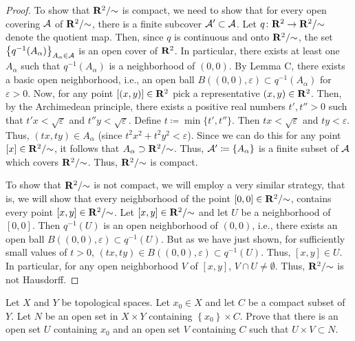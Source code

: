\begin{proof}
To show that $\mathbf{R}^2/{\sim}$ is compact, we need to show that for every
open covering $\mathcal{A}$ of $\mathbf{R}^2/{\sim}$, there is a finite subcover
$\mathcal{A}'\subset\mathcal{A}$. Let $q\colon\mathbf{R}^2\to\mathbf{R}^2/{\sim}$ denote the
quotient map. Then, since $q$ is continuous and onto $\mathbf{R}^2/{\sim}$, the
set $\left\{q^{-1}(A_\alpha)\right\}_{A_\alpha\in\mathcal{A}}$ is an open cover
of $\mathbf{R}^2$. In particular, there exists at least one $A_\alpha$ such that
$q^{-1}(A_\alpha)$ is a neighborhood of $(0,0)$. By Lemma C, there exists a
basic open neighborhood, i.e., an open ball $B((0,0),\varepsilon)\subset
q^{-1}(A_\alpha)$ for $\varepsilon>0$. Now, for any point
$[(x,y)]\in\mathbf{R}^2$ pick a representative $(x,y)\in\mathbf{R}^2$. Then, by the
Archimedean principle, there exists a positive real numbers $t',t''>0$ such
that $t'x<\sqrt{\varepsilon}$ and $t''y<\sqrt{\varepsilon}$. Define
$t\coloneqq\min\{t',t''\}$. Then $tx<\sqrt{\varepsilon}$ and
$ty<\varepsilon$. Thus, $(tx,ty)\in A_\alpha$ (since
$t^2x^2+t^2y^2<\varepsilon$). Since we can do this for any point
$[x]\in\mathbf{R}^2/{\sim}$, it follows that
$A_\alpha\supset\mathbf{R}^2/{\sim}$. Thus,
$\mathcal{A}'\coloneqq\left\{A_\alpha\right\}$ is a finite subset of $\mathcal{A}$
which covers $\mathbf{R}^2/{\sim}$. Thus, $\mathbf{R}^2/{\sim}$ is compact.

To show that $\mathbf{R}^2/{\sim}$ is not compact, we will employ a very similar
strategy, that is, we will show that every neighborhood of the point
$[0,0]\in\mathbf{R}^2/{\sim}$, contains every point $[x,y]\in\mathbf{R}^2/{\sim}$. Let
$[x,y]\in\mathbf{R}^2/{\sim}$ and let $U$ be a neighborhood of $[0,0]$. Then
$q^{-1}(U)$ is an open neighborhood of $(0,0)$, i.e., there exists an open
ball $B((0,0),\varepsilon)\subset q^{-1}(U)$. But as we have just shown,
for sufficiently small values of $t>0$, $(tx,ty)\in
B((0,0),\varepsilon)\subset q^{-1}(U)$. Thus, $[x,y]\in U$. In particular,
for any open neighborhood $V$ of $[x,y]$, $V\cap U\neq\emptyset$. Thus,
$\mathbf{R}^2/{\sim}$ is not Hausdorff.
\end{proof}
\begin{problem}
Let $X$ and $Y$ be topological spaces. Let $x_0\in X$ and let $C$ be a
compact subset of $Y$. Let $N$ be an open set in $X\times Y$ containing
$\left\{x_0\right\}\times C$. Prove that there is an open set $U$
containing $x_0$ and an open set $V$ containing $C$ such that $U\times
V\subset N$.
\end{problem}
